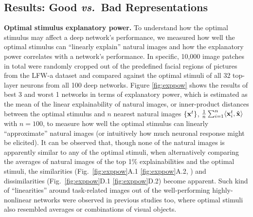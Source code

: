 \documentclass[10pt,twocolumn,letterpaper]{article}
\begin{document}

\subsection{Results: Good \textbf{\textit{vs.}}~Bad Representations}

{\bf Optimal stimulus explanatory power.} To understand how the optimal stimulus may affect a deep network's performance, we {measured} how well the optimal stimulus can ``linearly explain'' natural images and how the explanatory power correlates with a network's performance.
In specific, 10,000 image patches in total {were} randomly cropped out of the predefined facial regions of pictures from the LFW-a dataset \cite{wolf2011effective} and compared against the optimal stimuli of all 32 top-layer neurons from all 100 deep networks. 
Figure \ref{fig:exppow} shows the results of best 3 and worst 1 networks in terms of explanatory power, which is estimated as the mean of the linear explainability of natural images, or inner-product distances between the optimal stimulus and $n$ nearest natural images $\left\lbrace {\bf{x}}^{t} \right\rbrace$, \ie $\frac{1}{n}\sum_{i=1}^{n} \langle {\bf{x}}^{t}_{i} , \hat{{\bf{x}}} \rangle$ with $n=100$, to measure how well the optimal stimulus can linearly ``approximate'' natural images (or intuitively how much neuronal response might be elicited).
It can be observed that, though none of the natural images is apparently similar to any of the optimal stimuli, when alternatively comparing the averages of natural images of the top 1\% explainabilities and the optimal stimuli, the similarities (Fig.~\ref{fig:exppow}A.1 \vs \ref{fig:exppow}A.2, \etc) and dissimilarities (Fig.~\ref{fig:exppow}D.1 \vs \ref{fig:exppow}D.2) become apparent.
Such kind of ``linearities'' around task-related images out of the well-performing highly-nonlinear networks were observed in previous studies \cite{le2012building, simonyan2013deep} too, where optimal stimuli also resembled averages or combinations of visual objects.

\end{document}
